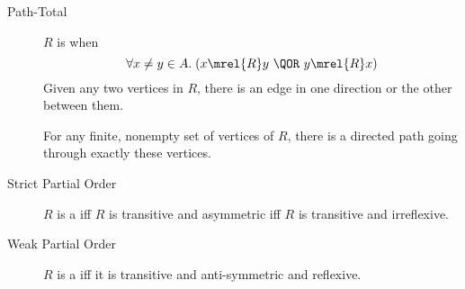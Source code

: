 \begin{description}
\item[Path-Total] $R$ is  when
\[
 \forall x \neq y \in A. \; (x \mrel{R} y\ \QOR\ y \mrel{R} x)
\]
Given any two vertices in $R$, there is an edge in one direction or the
other between them.

For any finite, nonempty set of vertices of $R$, there is a directed path
going through exactly these vertices.

\item[Strict Partial Order] $R$ is a  iff
  $R$ is transitive and asymmetric iff $R$ is transitive and
  irreflexive.

\item[Weak Partial Order] $R$ is a  iff it is
  transitive and anti-symmetric and reflexive.

\end{description}


\endinput

